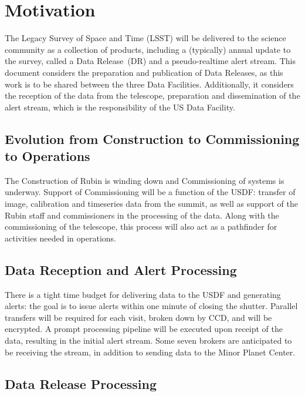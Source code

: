 \section{Motivation}
\label{sec:motivation}

The Legacy Survey of Space and Time (LSST) will be delivered to the science community as a collection of products, including a (typically) annual update to the survey, called a Data Release~(DR) and a pseudo-realtime alert stream. This document considers the preparation and publication of Data Releases, as this work is to be shared between the three Data Facilities. Additionally, it considers the reception of the data from the telescope, preparation and dissemination of the alert stream, which is the responsibility of the US Data Facility.

\subsection{Evolution from Construction to Commissioning to Operations}

The Construction of Rubin is winding down and Commissioning of systems is underway. Support of Commissioning will be a function of the USDF: transfer of image, calibration and timeseries data from the summit, as well as support of the Rubin staff and commissioners in the processing of the data. Along with the commissioning of the telescope, this process will also act as a pathfinder for activities needed in operations.



\subsection{Data Reception and Alert Processing}

There is a tight time budget for delivering data to the USDF and generating alerts: the goal is to issue alerts within one minute of closing the shutter. Parallel transfers will be required for each visit, broken down by CCD, and will be encrypted. A prompt processing pipeline will be executed upon receipt of the data, resulting in the initial alert stream. Some seven brokers are anticipated to be receiving the stream, in addition to sending data to the Minor Planet Center.

\subsection{Data Release Processing}


